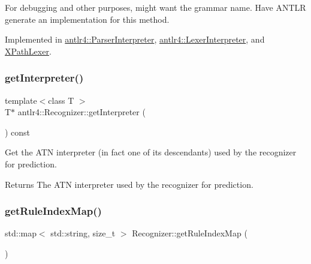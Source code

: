 For debugging and other purposes, might want the grammar name. Have A\+N\+T\+LR generate an implementation for this method. 



Implemented in \hyperlink{classantlr4_1_1ParserInterpreter_a14fc40b7791578d486eacffd2c5bb483}{antlr4\+::\+Parser\+Interpreter}, \hyperlink{classantlr4_1_1LexerInterpreter_a9f2f177e3a27be86cbb8b84d7bd3ca37}{antlr4\+::\+Lexer\+Interpreter}, and \hyperlink{classXPathLexer_aa212943fac87921b6793fda3b6dae10f}{X\+Path\+Lexer}.

\mbox{\label{classantlr4_1_1Recognizer_a926f7b518ef08afd27eb9ab1af2e2757}} 
\subsubsection{\texorpdfstring{get\+Interpreter()}{getInterpreter()}}
{\footnotesize\ttfamily template$<$class T $>$ \\
T$\ast$ antlr4\+::\+Recognizer\+::get\+Interpreter (\begin{DoxyParamCaption}{ }\end{DoxyParamCaption}) const\hspace{0.3cm}{\ttfamily [inline]}}

Get the A\+TN interpreter (in fact one of it\textquotesingle{}s descendants) used by the recognizer for prediction. \begin{DoxyReturn}{Returns}
The A\+TN interpreter used by the recognizer for prediction. 
\end{DoxyReturn}
\mbox{\label{classantlr4_1_1Recognizer_a0475c564435567fc8cc6644221727d6a}} 
\subsubsection{\texorpdfstring{get\+Rule\+Index\+Map()}{getRuleIndexMap()}}
{\footnotesize\ttfamily std\+::map$<$ std\+::string, size\+\_\+t $>$ Recognizer\+::get\+Rule\+Index\+Map (\begin{DoxyParamCaption}{ }\end{DoxyParamCaption})\hspace{0.3cm}{\ttfamily [virtual]}}



